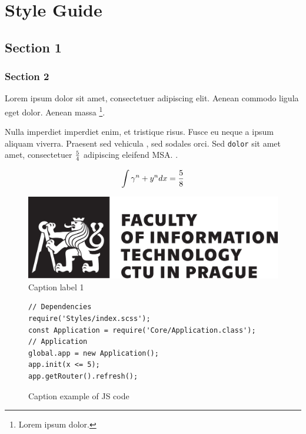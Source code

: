 \chapter{Style Guide}\label{styleguide}



\section{Section 1}



\subsection{Section 2}

\begin{REFACTOR}
   Lorem ipsum dolor sit amet, consectetuer adipiscing elit. Aenean commodo ligula eget dolor. Aenean massa \footnote{Lorem ipsum dolor.}.
\end{REFACTOR}


Nulla imperdiet imperdiet enim, et tristique risus. Fusce eu neque a ipsum aliquam viverra. Praesent sed vehicula , sed sodales orci. Sed \verb|dolor| sit amet amet, consectetuer ${5} \over {4}$ adipiscing eleifend \gls{MSA}. .

$$\int {\gamma^n + y^n } dx = { 5 \over 8}$$

\begin{figure}
   \centering
   \includegraphics[max width=\textwidth]{cvut-logo-bw-en.pdf}
   \caption[List label 1]{Caption label 1}\label{pic:ctulogo}
\end{figure}


\begin{figure}
   \centering
   \begin{verbatim}
// Dependencies
require('Styles/index.scss');
const Application = require('Core/Application.class');
// Application
global.app = new Application();
app.init(x <= 5);
app.getRouter().refresh();
   \end{verbatim}
   \caption[List example of JS code]{Caption example of JS code}\label{code:jsexample}
\end{figure}



